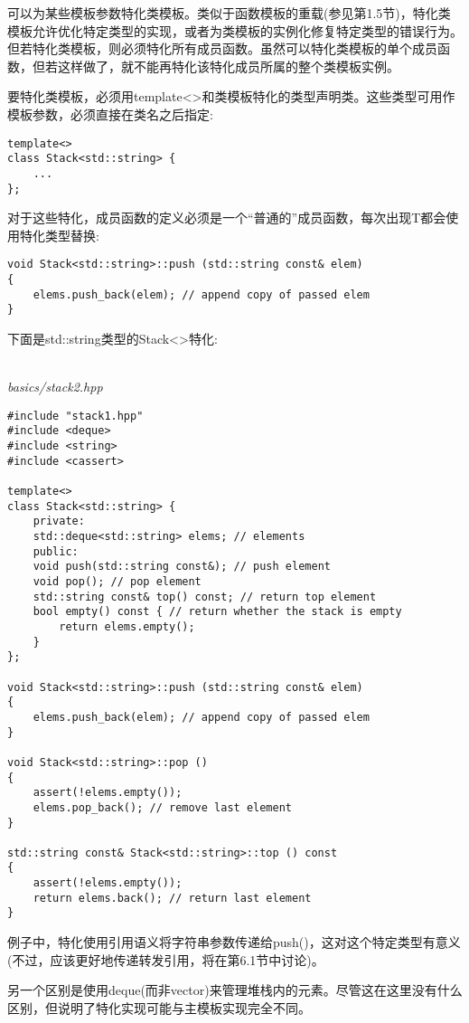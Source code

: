 可以为某些模板参数特化类模板。类似于函数模板的重载(参见第1.5节)，特化类模板允许优化特定类型的实现，或者为类模板的实例化修复特定类型的错误行为。但若特化类模板，则必须特化所有成员函数。虽然可以特化类模板的单个成员函数，但若这样做了，就不能再特化该特化成员所属的整个类模板实例。

要特化类模板，必须用template<>和类模板特化的类型声明类。这些类型可用作模板参数，必须直接在类名之后指定:

\begin{lstlisting}[style=styleCXX]
template<>
class Stack<std::string> {
	...
};
\end{lstlisting}

对于这些特化，成员函数的定义必须是一个“普通的”成员函数，每次出现T都会使用特化类型替换:

\begin{lstlisting}[style=styleCXX]
void Stack<std::string>::push (std::string const& elem)
{
	elems.push_back(elem); // append copy of passed elem
}
\end{lstlisting}

下面是std::string类型的Stack<>特化:

\hspace*{\fill} \\ %
\noindent
\textit{basics/stack2.hpp}
\begin{lstlisting}[style=styleCXX]
#include "stack1.hpp"
#include <deque>
#include <string>
#include <cassert>

template<>
class Stack<std::string> {
	private:
	std::deque<std::string> elems; // elements
	public:
	void push(std::string const&); // push element
	void pop(); // pop element
	std::string const& top() const; // return top element
	bool empty() const { // return whether the stack is empty
		return elems.empty();
	}
};

void Stack<std::string>::push (std::string const& elem)
{
	elems.push_back(elem); // append copy of passed elem
}

void Stack<std::string>::pop ()
{
	assert(!elems.empty());
	elems.pop_back(); // remove last element
}

std::string const& Stack<std::string>::top () const
{
	assert(!elems.empty());
	return elems.back(); // return last element
}
\end{lstlisting}

例子中，特化使用引用语义将字符串参数传递给push()，这对这个特定类型有意义(不过，应该更好地传递转发引用，将在第6.1节中讨论)。

另一个区别是使用deque(而非vector)来管理堆栈内的元素。尽管这在这里没有什么区别，但说明了特化实现可能与主模板实现完全不同。





















